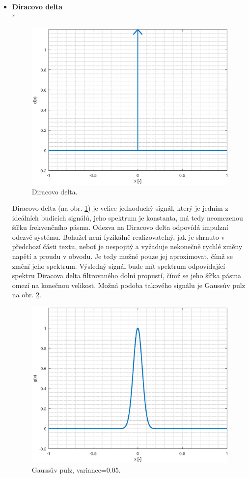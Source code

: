 \begin{itemize}
	\item
	\textbf{Diracovo delta}\\*	
	\begin{figure}[htbp]\includegraphics[width=\textwidth,keepaspectratio]{images/dirac.eps}\caption{Diracovo delta.}\label{dirac}\end{figure}		
	Diracovo delta (na obr. \ref{dirac}) je velice jednoduchý signál, který je jedním z ideálních budicích signálů, jeho spektrum je konstanta, má tedy neomezenou šířku frekvenčního pásma. Odezva na Diracovo delta odpovídá impulzní odezvě systému.  Bohužel není fyzikálně realizovatelný, jak je shrnuto v předchozí části textu, neboť je nespojitý a vyžaduje nekonečně rychlé změny napětí a proudu v obvodu. Je tedy možné pouze jej aproximovat, čímž se změní jeho spektrum. Výsledný signál bude mít spektrum odpovídající spektru Diracova delta filtrovaného dolní propustí, čímž se jeho šířka pásma omezí na konečnou velikost. Možná podoba takového signálu je Gaussův pulz na obr. \ref{gauss}.
	
	\begin{figure}[htbp]\includegraphics[width=\textwidth,keepaspectratio]{images/gauss.eps}\caption{Gaussův pulz, variance=0.05.}\label{gauss}\end{figure}			
	

\end{itemize}
